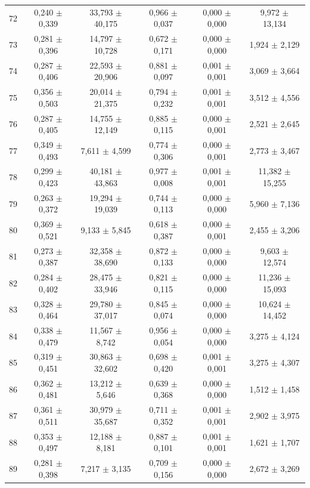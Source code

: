 \begin{tabular}{l c c c c c}
72 & 0,240 $\pm$ 0,339 & 33,793 $\pm$ 40,175 & 0,966 $\pm$ 0,037 & 0,000 $\pm$ 0,000 & 9,972 $\pm$ 13,134 \\
73 & 0,281 $\pm$ 0,396 & 14,797 $\pm$ 10,728 & 0,672 $\pm$ 0,171 & 0,000 $\pm$ 0,000 & 1,924 $\pm$ 2,129 \\
74 & 0,287 $\pm$ 0,406 & 22,593 $\pm$ 20,906 & 0,881 $\pm$ 0,097 & 0,001 $\pm$ 0,001 & 3,069 $\pm$ 3,664 \\
75 & 0,356 $\pm$ 0,503 & 20,014 $\pm$ 21,375 & 0,794 $\pm$ 0,232 & 0,001 $\pm$ 0,001 & 3,512 $\pm$ 4,556 \\
76 & 0,287 $\pm$ 0,405 & 14,755 $\pm$ 12,149 & 0,885 $\pm$ 0,115 & 0,000 $\pm$ 0,001 & 2,521 $\pm$ 2,645 \\
77 & 0,349 $\pm$ 0,493 & 7,611 $\pm$ 4,599 & 0,774 $\pm$ 0,306 & 0,000 $\pm$ 0,001 & 2,773 $\pm$ 3,467 \\
78 & 0,299 $\pm$ 0,423 & 40,181 $\pm$ 43,863 & 0,977 $\pm$ 0,008 & 0,001 $\pm$ 0,001 & 11,382 $\pm$ 15,255 \\
79 & 0,263 $\pm$ 0,372 & 19,294 $\pm$ 19,039 & 0,744 $\pm$ 0,113 & 0,000 $\pm$ 0,000 & 5,960 $\pm$ 7,136 \\
80 & 0,369 $\pm$ 0,521 & 9,133 $\pm$ 5,845 & 0,618 $\pm$ 0,387 & 0,000 $\pm$ 0,001 & 2,455 $\pm$ 3,206 \\
81 & 0,273 $\pm$ 0,387 & 32,358 $\pm$ 38,690 & 0,872 $\pm$ 0,133 & 0,000 $\pm$ 0,000 & 9,603 $\pm$ 12,574 \\
82 & 0,284 $\pm$ 0,402 & 28,475 $\pm$ 33,946 & 0,821 $\pm$ 0,115 & 0,000 $\pm$ 0,000 & 11,236 $\pm$ 15,093 \\
83 & 0,328 $\pm$ 0,464 & 29,780 $\pm$ 37,017 & 0,845 $\pm$ 0,074 & 0,000 $\pm$ 0,000 & 10,624 $\pm$ 14,452 \\
84 & 0,338 $\pm$ 0,479 & 11,567 $\pm$ 8,742 & 0,956 $\pm$ 0,054 & 0,000 $\pm$ 0,000 & 3,275 $\pm$ 4,124 \\
85 & 0,319 $\pm$ 0,451 & 30,863 $\pm$ 32,602 & 0,698 $\pm$ 0,420 & 0,001 $\pm$ 0,001 & 3,275 $\pm$ 4,307 \\
86 & 0,362 $\pm$ 0,481 & 13,212 $\pm$ 5,646 & 0,639 $\pm$ 0,368 & 0,000 $\pm$ 0,000 & 1,512 $\pm$ 1,458 \\
87 & 0,361 $\pm$ 0,511 & 30,979 $\pm$ 35,687 & 0,711 $\pm$ 0,352 & 0,001 $\pm$ 0,001 & 2,902 $\pm$ 3,975 \\
88 & 0,353 $\pm$ 0,497 & 12,188 $\pm$ 8,181 & 0,887 $\pm$ 0,101 & 0,001 $\pm$ 0,001 & 1,621 $\pm$ 1,707 \\
89 & 0,281 $\pm$ 0,398 & 7,217 $\pm$ 3,135 & 0,709 $\pm$ 0,156 & 0,000 $\pm$ 0,000 & 2,672 $\pm$ 3,269 \\

\end{tabular}

